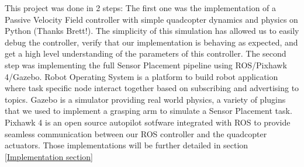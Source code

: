 This project was done in 2 steps: The first one was the implementation of a Passive Velocity Field controller with simple quadcopter dynamics and physics on Python (Thanks Brett!). The simplicity of this simulation has allowed us to easily debug the controller, verify that our implementation is behaving as expected, and get a high level understanding of the parameters of this controller. 
The second step was implementing the full Sensor Placement pipeline using ROS/Pixhawk 4/Gazebo. Robot Operating System is a platform to build robot application where task specific node interact together based on subscribing and advertising to topics. Gazebo is a simulator providing real world physics, a variety of plugins that we used to implement a grasping arm to simulate a Sensor Placement task. Pixhawk 4 is an open source autopilot sotfware integrated with ROS to provide seamless communication between our ROS controller and the quadcopter actuators.
Those implementations will be further detailed in section \ref{Implementation section}

